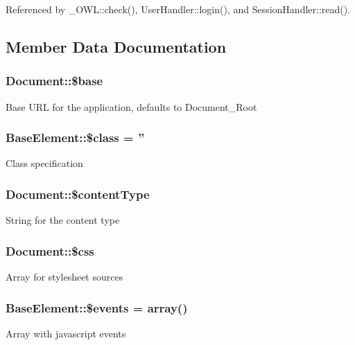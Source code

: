 Referenced by \_\-OWL::check(), UserHandler::login(), and SessionHandler::read().



\subsection{Member Data Documentation}
\subsubsection[{\$base}]{\setlength{\rightskip}{0pt plus 5cm}Document::\$base}\label{classDocument_a5a5f2c002eaff3b5c0d0c2ef85b3496d}
Base URL for the application, defaults to Document\_\-Root 
\subsubsection[{\$class}]{\setlength{\rightskip}{0pt plus 5cm}BaseElement::\$class = ''}\label{classBaseElement_a99976a8e967db92e7800309f359b0803}
Class specification 
\subsubsection[{\$contentType}]{\setlength{\rightskip}{0pt plus 5cm}Document::\$contentType}\label{classDocument_ab1cd325e8c6dc65ec0512e759d120b0e}
String for the content type 
\subsubsection[{\$css}]{\setlength{\rightskip}{0pt plus 5cm}Document::\$css}\label{classDocument_a635d9d19a754911129ac92e8b00f4f31}
Array for stylesheet sources 
\subsubsection[{\$events}]{\setlength{\rightskip}{0pt plus 5cm}BaseElement::\$events = array()}\label{classBaseElement_a02cebe45d277b4ff8f29db08bad371ba}
Array with javascript events 

